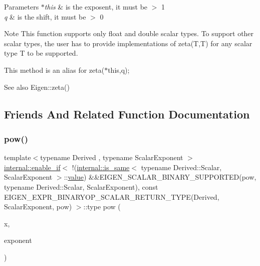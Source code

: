 \begin{DoxyParams}{Parameters}
{\em $\ast$this} & is the exposent, it must be $>$ 1 \\
\hline
{\em q} & is the shift, it must be $>$ 0\\
\hline
\end{DoxyParams}
\begin{DoxyNote}{Note}
This function supports only float and double scalar types. To support other scalar types, the user has to provide implementations of zeta(\+T,\+T) for any scalar type T to be supported.
\end{DoxyNote}
This method is an alias for zeta($\ast$this,q);

\begin{DoxySeeAlso}{See also}
Eigen\+::zeta() 
\end{DoxySeeAlso}


\subsection{Friends And Related Function Documentation}
\mbox{\label{class_eigen_1_1_array_base_ab6dc101d82e8228a19a8840e3a29c1c9}} 
\subsubsection{\texorpdfstring{pow()}{pow()}\hspace{0.1cm}{\footnotesize\ttfamily [1/3]}}
{\footnotesize\ttfamily template$<$typename Derived , typename Scalar\+Exponent $>$ \\
\mbox{\hyperlink{struct_eigen_1_1internal_1_1enable__if}{internal\+::enable\+\_\+if}}$<$ !(\mbox{\hyperlink{struct_eigen_1_1internal_1_1is__same}{internal\+::is\+\_\+same}}$<$ typename Derived\+::\+Scalar, Scalar\+Exponent $>$\+::\mbox{\hyperlink{class_eigen_1_1_dense_base_a8da735a6bfc7012606acf787156d10a0}{value}}) \&\&E\+I\+G\+E\+N\+\_\+\+S\+C\+A\+L\+A\+R\+\_\+\+B\+I\+N\+A\+R\+Y\+\_\+\+S\+U\+P\+P\+O\+R\+T\+ED(pow, typename Derived\+::\+Scalar, Scalar\+Exponent), const E\+I\+G\+E\+N\+\_\+\+E\+X\+P\+R\+\_\+\+B\+I\+N\+A\+R\+Y\+O\+P\+\_\+\+S\+C\+A\+L\+A\+R\+\_\+\+R\+E\+T\+U\+R\+N\+\_\+\+T\+Y\+PE(Derived, Scalar\+Exponent, pow) $>$\+::type pow (\begin{DoxyParamCaption}\item[{const \mbox{\hyperlink{class_eigen_1_1_array_base}{Eigen\+::\+Array\+Base}}$<$ Derived $>$ \&}]{x,  }\item[{const Scalar\+Exponent \&}]{exponent }\end{DoxyParamCaption})\hspace{0.3cm}{\ttfamily [related]}}

